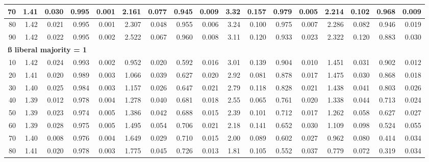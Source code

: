 \documentclass[
]{article}
\begin{document}
\begin{table}[H]
{\begin{tabular}{r|r|r|r|r|r|r|r|r|r|r|r|r|r|r|r|r}
\hline
\hspace{1em}70 & 1.41 & 0.030 & 0.995 & 0.001 & 2.161 & 0.077 & 0.945 & 0.009 & 3.32 & 0.157 & 0.979 & 0.005 & 2.214 & 0.102 & 0.968 & 0.009\\
\hline
\hspace{1em}80 & 1.42 & 0.021 & 0.995 & 0.001 & 2.307 & 0.048 & 0.955 & 0.006 & 3.24 & 0.100 & 0.975 & 0.007 & 2.286 & 0.082 & 0.946 & 0.019\\
\hline
\hspace{1em}90 & 1.42 & 0.022 & 0.995 & 0.002 & 2.522 & 0.067 & 0.960 & 0.008 & 3.11 & 0.120 & 0.933 & 0.023 & 2.322 & 0.120 & 0.883 & 0.030\\
\hline
\multicolumn{17}{l}{\textbf{ß liberal majority = 1}}\\
\hline
\hspace{1em}10 & 1.42 & 0.024 & 0.993 & 0.002 & 0.952 & 0.020 & 0.592 & 0.016 & 3.01 & 0.139 & 0.904 & 0.010 & 1.451 & 0.031 & 0.902 & 0.012\\
\hline
\hspace{1em}20 & 1.41 & 0.020 & 0.989 & 0.003 & 1.066 & 0.039 & 0.627 & 0.020 & 2.92 & 0.081 & 0.878 & 0.017 & 1.475 & 0.030 & 0.868 & 0.018\\
\hline
\hspace{1em}30 & 1.40 & 0.025 & 0.984 & 0.003 & 1.157 & 0.026 & 0.647 & 0.021 & 2.79 & 0.118 & 0.828 & 0.021 & 1.438 & 0.041 & 0.803 & 0.026\\
\hline
\hspace{1em}40 & 1.39 & 0.012 & 0.978 & 0.004 & 1.278 & 0.040 & 0.681 & 0.018 & 2.55 & 0.065 & 0.761 & 0.020 & 1.338 & 0.044 & 0.713 & 0.024\\
\hline
\hspace{1em}50 & 1.39 & 0.023 & 0.974 & 0.005 & 1.386 & 0.042 & 0.688 & 0.015 & 2.39 & 0.101 & 0.712 & 0.017 & 1.262 & 0.058 & 0.627 & 0.027\\
\hline
\hspace{1em}60 & 1.39 & 0.028 & 0.975 & 0.005 & 1.495 & 0.054 & 0.706 & 0.021 & 2.18 & 0.141 & 0.652 & 0.030 & 1.109 & 0.098 & 0.524 & 0.055\\
\hline
\hspace{1em}70 & 1.40 & 0.008 & 0.976 & 0.004 & 1.649 & 0.029 & 0.710 & 0.015 & 2.00 & 0.089 & 0.602 & 0.027 & 0.962 & 0.080 & 0.414 & 0.034\\
\hline
\hspace{1em}80 & 1.41 & 0.020 & 0.978 & 0.003 & 1.775 & 0.045 & 0.726 & 0.013 & 1.81 & 0.105 & 0.552 & 0.037 & 0.779 & 0.072 & 0.319 & 0.034\\

\end{tabular}}
\end{table}
\end{document}
